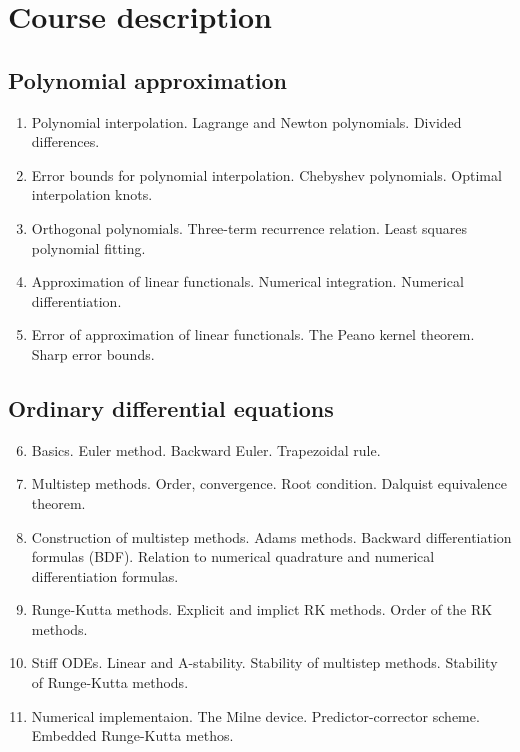\setcounter{section}{-1}
\section{Course description}
\subsection{Polynomial approximation}


\begin{enumerate}
  \item Polynomial interpolation. Lagrange and Newton polynomials. Divided differences.
  \item Error bounds for polynomial interpolation. Chebyshev polynomials. Optimal interpolation knots.

  \item Orthogonal polynomials. Three-term recurrence relation. Least squares polynomial fitting.

  \item Approximation of linear functionals. Numerical integration. Numerical differentiation.

  \item Error of approximation of linear functionals. The Peano kernel theorem. Sharp error bounds.

\end{enumerate}

\subsection{Ordinary differential equations}

\begin{enumerate}
  \setcounter{enumi}{5}
  \item Basics. Euler method. Backward Euler. Trapezoidal rule.
  \item Multistep methods. Order, convergence. Root condition. Dalquist equivalence theorem.

  \item Construction of multistep methods. Adams methods. Backward differentiation formulas (BDF). Relation to numerical quadrature and numerical differentiation formulas.

  \item Runge-Kutta methods. Explicit and implict RK methods. Order of the RK methods.

  \item Stiff ODEs. Linear and A-stability. Stability of multistep methods. Stability of Runge-Kutta methods.

  \item Numerical implementaion. The Milne device. Predictor-corrector scheme. Embedded Runge-Kutta methos.

\end{enumerate}
